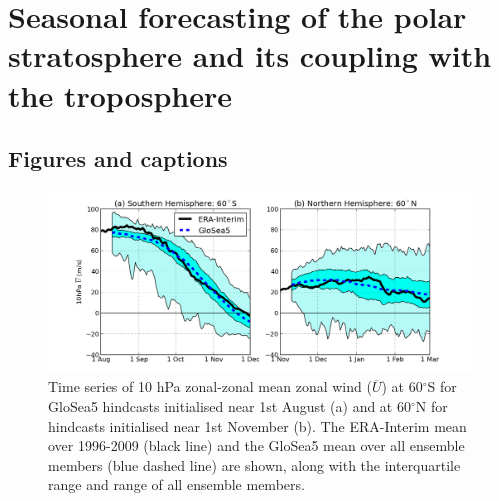\section{Seasonal forecasting of the polar stratosphere and its coupling
with the
troposphere}\label{seasonal-forecasting-of-the-polar-stratosphere-and-its-coupling-with-the-troposphere}

\subsection{Figures and captions}\label{figures-and-captions}

\begin{figure}[htbp]
\centering
\includegraphics{./figures/zm_winds.png}
\caption{Time series of 10 hPa zonal-zonal mean zonal wind
($\overline{U}$) at 60$^{\circ}$S for GloSea5 hindcasts initialised near
1st August (a) and at 60$^{\circ}$N for hindcasts initialised near 1st
November (b). The ERA-Interim mean over 1996-2009 (black line) and the
GloSea5 mean over all ensemble members (blue dashed line) are shown,
along with the interquartile range and range of all ensemble members.}
\end{figure}

